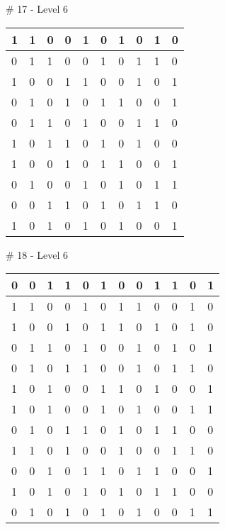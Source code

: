 \smallskip

\# 17 - Level 6 \newline
\begin{tabular}{|m{\collen}|m{\collen}|m{\collen}|m{\collen}|m{\collen}|m{\collen}|m{\collen}|m{\collen}|m{\collen}|m{\collen}|}
\hline
  1 & 1 & 0 & 0 & 1 & 0 & 1 & 0 & 1 & 0 \\
\hline
  0 & 1 & 1 & 0 & 0 & 1 & 0 & 1 & 1 & 0 \\
\hline
  1 & 0 & 0 & 1 & 1 & 0 & 0 & 1 & 0 & 1 \\
\hline
  0 & 1 & 0 & 1 & 0 & 1 & 1 & 0 & 0 & 1 \\
\hline
  0 & 1 & 1 & 0 & 1 & 0 & 0 & 1 & 1 & 0 \\
\hline
  1 & 0 & 1 & 1 & 0 & 1 & 0 & 1 & 0 & 0 \\
\hline
  1 & 0 & 0 & 1 & 0 & 1 & 1 & 0 & 0 & 1 \\
\hline
  0 & 1 & 0 & 0 & 1 & 0 & 1 & 0 & 1 & 1 \\
\hline
  0 & 0 & 1 & 1 & 0 & 1 & 0 & 1 & 1 & 0 \\
\hline
  1 & 0 & 1 & 0 & 1 & 0 & 1 & 0 & 0 & 1 \\
\hline
\end{tabular}


\smallskip

\# 18 - Level 6 \newline
\begin{tabular}{|m{\collen}|m{\collen}|m{\collen}|m{\collen}|m{\collen}|m{\collen}|m{\collen}|m{\collen}|m{\collen}|m{\collen}|m{\collen}|m{\collen}|}
\hline
  0 & 0 & 1 & 1 & 0 & 1 & 0 & 0 & 1 & 1 & 0 & 1 \\
\hline
  1 & 1 & 0 & 0 & 1 & 0 & 1 & 1 & 0 & 0 & 1 & 0 \\
\hline
  1 & 0 & 0 & 1 & 0 & 1 & 1 & 0 & 1 & 0 & 1 & 0 \\
\hline
  0 & 1 & 1 & 0 & 1 & 0 & 0 & 1 & 0 & 1 & 0 & 1 \\
\hline
  0 & 1 & 0 & 1 & 1 & 0 & 0 & 1 & 0 & 1 & 1 & 0 \\
\hline
  1 & 0 & 1 & 0 & 0 & 1 & 1 & 0 & 1 & 0 & 0 & 1 \\
\hline
  1 & 0 & 1 & 0 & 0 & 1 & 0 & 1 & 0 & 0 & 1 & 1 \\
\hline
  0 & 1 & 0 & 1 & 1 & 0 & 1 & 0 & 1 & 1 & 0 & 0 \\
\hline
  1 & 1 & 0 & 1 & 0 & 0 & 1 & 0 & 0 & 1 & 1 & 0 \\
\hline
  0 & 0 & 1 & 0 & 1 & 1 & 0 & 1 & 1 & 0 & 0 & 1 \\
\hline
  1 & 0 & 1 & 0 & 1 & 0 & 1 & 0 & 1 & 1 & 0 & 0 \\
\hline
  0 & 1 & 0 & 1 & 0 & 1 & 0 & 1 & 0 & 0 & 1 & 1 \\
\hline
\end{tabular}


